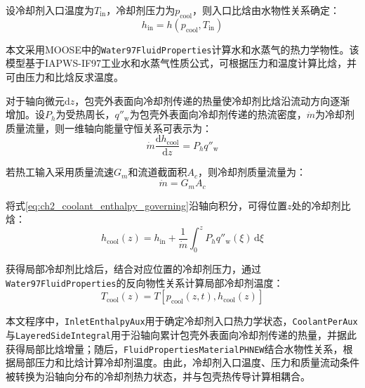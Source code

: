 设冷却剂入口温度为$T_{\mathrm{in}}$，冷却剂压力为$p_{\mathrm{cool}}$，则入口比{\rarecharfont 焓}由水物性关系确定：
\begin{equation}
	h_{\mathrm{in}}
	=h\!\left(p_{\mathrm{cool}},T_{\mathrm{in}}\right)
	\label{eq:ch2_coolant_inlet_enthalpy}
\end{equation}

本文采用MOOSE中的\texttt{Water97FluidProperties}计算水和水蒸气的热力学物性。该模型基于IAPWS-IF97工业水和水蒸气性质公式\cite{wagnerPropertiesWaterSteam1998}，可根据压力和温度计算比{\rarecharfont 焓}，并可由压力和比{\rarecharfont 焓}反求温度。

对于轴向微元$\mathrm dz$，包壳外表面向冷却剂传递的热量使冷却剂比{\rarecharfont 焓}沿流动方向逐渐增加。设$P_h$为受热周长，$q''_{\mathrm w}$为包壳外表面向冷却剂传递的热流密度，$\dot m$为冷却剂质量流量，则一维轴向能量守恒关系可表示为：
\begin{equation}
	\dot m\frac{\mathrm dh_{\mathrm{cool}}}{\mathrm dz}
	=P_hq''_{\mathrm w}
	\label{eq:ch2_coolant_enthalpy_governing}
\end{equation}

若热工输入采用质量流速$G_m$和流道截面积$A_c$，则冷却剂质量流量为：
\begin{equation}
	\dot m=G_mA_c
	\label{eq:ch2_coolant_mass_flow}
\end{equation}

将式\eqref{eq:ch2_coolant_enthalpy_governing}沿轴向积分，可得位置$z$处的冷却剂比{\rarecharfont 焓}：
\begin{equation}
	h_{\mathrm{cool}}(z)
	=h_{\mathrm{in}}
	+\frac{1}{\dot m}
	\int_0^z P_hq''_{\mathrm w}(\xi)\,\mathrm d\xi
	\label{eq:ch2_coolant_enthalpy_integral}
\end{equation}

获得局部冷却剂比{\rarecharfont 焓}后，结合对应位置的冷却剂压力，通过\texttt{Water97FluidProperties}的反向物性关系计算局部冷却剂温度：
\begin{equation}
	T_{\mathrm{cool}}(z)
	=T\!\left[p_{\mathrm{cool}}(z,t),h_{\mathrm{cool}}(z)\right]
	\label{eq:ch2_coolant_temperature_ph}
\end{equation}

本文程序中，\texttt{InletEnthalpyAux}用于确定冷却剂入口热力学状态，\texttt{CoolantPerAux}与\texttt{LayeredSideIntegral}用于沿轴向累计包壳外表面向冷却剂传递的热量，并据此获得局部比{\rarecharfont 焓}增量；随后，\texttt{FluidPropertiesMaterialPHNEW}结合水物性关系，根据局部压力和比{\rarecharfont 焓}计算冷却剂温度。由此，冷却剂入口温度、压力和质量流动条件被转换为沿轴向分布的冷却剂热力状态，并与包壳热传导计算相耦合。


